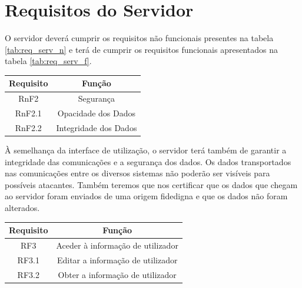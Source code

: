 \section{Requisitos do Servidor} \label{sec:req_servidor}
 
O servidor deverá cumprir os requisitos não funcionais presentes na tabela \ref{tab:req_serv_n} e terá de cumprir os requisitos funcionais apresentados na tabela \ref{tab:req_serv_f}.

\begin{center}
\begin{tabular}[c]{c c} 
\hline
Requisito & Função\\ %
\hline
RnF2 & Segurança\\ 

RnF2.1 & Opacidade dos Dados\\

RnF2.2 & Integridade dos Dados\\
\hline
\end{tabular}
\label{tab:req_serv_n}
\end{center}
\vspace{8mm} %

À semelhança da interface de utilização, o servidor terá também de garantir a integridade das comunicações e a segurança dos dados. Os dados transportados nas comunicações entre os diversos sistemas não poderão ser visíveis para possíveis atacantes. Também teremos que nos certificar que os dados que chegam ao servidor foram enviados de uma origem fidedigna e que os dados não foram alterados.\\

\begin{center}
\begin{tabular}[c]{c c} 
\hline
Requisito & Função\\ %
\hline
RF3 & Aceder à informação de utilizador\\ 

RF3.1 & Editar a informação de utilizador\\

RF3.2 & Obter a informação de utilizador\\
\hline
\end{tabular}
\label{tab:req_serv_f}
\end{center}
\vspace{8mm} %

